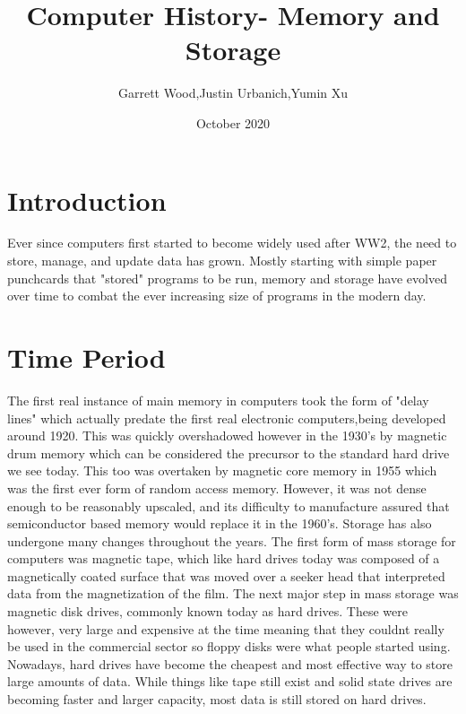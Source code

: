 \documentclass{article}
\title{Computer History- Memory and Storage}
\author{Garrett Wood,Justin Urbanich,Yumin Xu }
\date{October 2020}
\begin{document}
\maketitle

\section{Introduction}
Ever since computers first started to become widely used after WW2, the need to store, manage, and update data has grown. Mostly starting with simple paper punchcards that "stored" programs to be run, memory and storage have evolved over time to combat the ever increasing size of programs in the modern day.
\section{Time Period}
The first real instance of main memory in computers took the form of "delay lines" which actually predate the first real electronic computers,being developed around 1920. This was quickly overshadowed however in the 1930's by magnetic drum memory which can be considered the precursor to the standard hard drive we see today. This too was overtaken by magnetic core memory in 1955 which was the first ever form of random access memory. However, it was not dense enough to be reasonably upscaled, and its difficulty to manufacture assured that semiconductor based memory would replace it in the 1960's. Storage has also undergone many changes throughout the years. 
The first form of mass storage for computers was magnetic tape, which like hard drives today was composed of a magnetically coated surface that was moved over a seeker head that interpreted data from the magnetization of the film. The next major step in mass storage was magnetic disk drives, commonly known today as hard drives. These were however, very large and expensive at the time meaning that they couldnt really be used in the commercial sector so floppy disks were what people started using. Nowadays, hard drives have become the cheapest and most effective way to store large amounts of data. While things like tape still exist and solid state drives are becoming faster and larger capacity, most data is still stored on hard drives.
\end{document}
